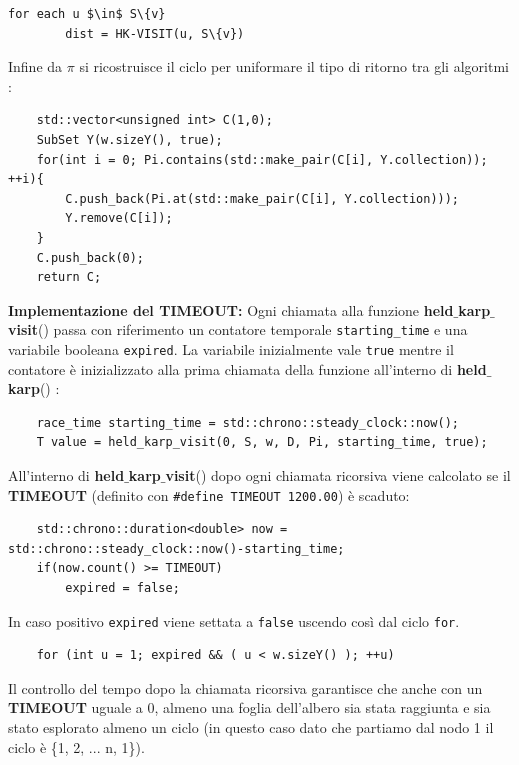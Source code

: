 \documentclass[]{article}
\begin{document}
\begin{flushleft}
\begin{lstlisting}[mathescape=true]
	for each u $\in$ S\{v}
		dist = HK-VISIT(u, S\{v})
\end{lstlisting}
Infine da $\pi$ si ricostruisce il ciclo per uniformare il tipo di ritorno tra gli algoritmi :
\lstset{language=c++, style=mystyle, firstnumber=43}
\begin{lstlisting}
    std::vector<unsigned int> C(1,0);
    SubSet Y(w.sizeY(), true);
    for(int i = 0; Pi.contains(std::make_pair(C[i], Y.collection)); ++i){
        C.push_back(Pi.at(std::make_pair(C[i], Y.collection)));
        Y.remove(C[i]);
    }
    C.push_back(0);
    return C;
\end{lstlisting}



\bigskip
\textbf{Implementazione del TIMEOUT:}
Ogni chiamata alla funzione \textbf{held$\_$karp$\_$visit}() passa con riferimento un contatore temporale \verb|starting_time| e una variabile booleana \verb|expired|.
La variabile inizialmente vale \verb|true| mentre il contatore è inizializzato alla prima chiamata della funzione all'interno di \textbf{held$\_$karp}() :
\lstset{language=c++, style=mystyle, firstnumber=40}
\begin{lstlisting}
	race_time starting_time = std::chrono::steady_clock::now();
	T value = held_karp_visit(0, S, w, D, Pi, starting_time, true);
\end{lstlisting}
\smallskip
All'interno di \textbf{held$\_$karp$\_$visit}() dopo ogni chiamata ricorsiva viene calcolato se il \textbf{TIMEOUT} (definito con \verb|#define TIMEOUT 1200.00|) è scaduto:
\lstset{language=c++, style=mystyle, firstnumber=21}
\begin{lstlisting}
	std::chrono::duration<double> now = std::chrono::steady_clock::now()-starting_time;
	if(now.count() >= TIMEOUT)
    	expired = false;
\end{lstlisting}
In caso positivo \verb|expired| viene settata a \verb|false| uscendo così dal ciclo \verb|for|.
\lstset{language=c++, style=mystyle, firstnumber=14}
\begin{lstlisting}
	for (int u = 1; expired && ( u < w.sizeY() ); ++u)
\end{lstlisting}
\medskip
Il controllo del tempo dopo la chiamata ricorsiva garantisce che anche con un \textbf{TIMEOUT} uguale a 0, almeno una foglia dell'albero sia stata raggiunta e sia stato esplorato almeno un ciclo (in questo caso dato che partiamo dal nodo 1 il ciclo è \{1, 2, ... n, 1\}).
\end{flushleft}
\end{document}
